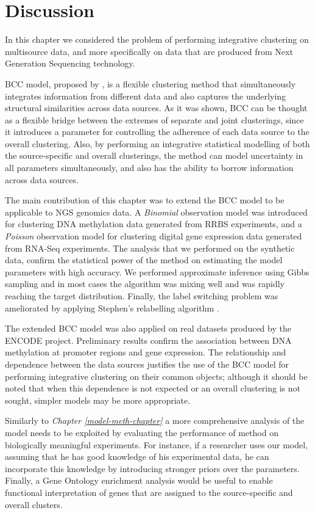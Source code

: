 \section{Discussion} \label{integr-discussion-sect}
In this chapter we considered the problem of performing integrative clustering on multisource data, and more specifically on data that are produced from Next Generation Sequencing technology.

BCC model, proposed by \citet{Lock2013}, is a flexible clustering method that simultaneously integrates information from different data and also captures the underlying structural similarities across data sources. As it was shown, BCC can be thought as a flexible bridge between the extremes of separate and joint clusterings, since it introduces a parameter for controlling the adherence of each data source to the overall clustering. Also, by performing an integrative statistical modelling of both the source-specific and overall clusterings, the method can model uncertainty in all parameters simultaneously, and also has the ability to borrow information across data sources.

The main contribution of this chapter was to extend the BCC model to be applicable to NGS genomics data. A \emph{Binomial} observation model was introduced for clustering DNA methylation data generated from RRBS experiments, and a \emph{Poisson} observation model for clustering digital gene expression data generated from RNA-Seq experiments. The analysis that we performed on the synthetic data, confirm the statistical power of the method on estimating the model parameters with high accuracy. We performed approximate inference using Gibbs sampling and in most cases the algorithm was mixing well and was rapidly reaching the target distribution. Finally, the label switching problem was ameliorated by applying Stephen's relabelling algorithm \citep{Stephens2000}.

The extended BCC model was also applied on real datasets produced by the ENCODE project. Preliminary results confirm the association between DNA methylation at promoter regions and gene expression. The relationship and dependence between the data sources justifies the use of the BCC model for performing integrative clustering on their common objects; although it should be noted that when this dependence is not expected or an overall clustering is not sought, simpler models may be more appropriate. 

Similarly to \emph{Chapter \ref{model-meth-chapter}} a more comprehensive analysis of the model needs to be exploited by evaluating the performance of method on  biologically meaningful experiments. For instance, if a researcher uses our model, assuming that he has good knowledge of his experimental data, he can incorporate this knowledge by introducing stronger priors over the parameters. Finally, a Gene Ontology enrichment analysis would be useful to enable functional interpretation of genes that are assigned to the source-specific and overall clusters.